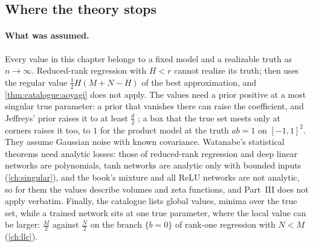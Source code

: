 \begin{refsection}

\section{Where the theory stops}\label{sec:catalogue:stops}

\paragraph{What was assumed.} Every value in this chapter belongs to a fixed model and a realizable truth as $n\to\infty$. Reduced-rank regression with $H<r$ cannot realize its truth; \textcite[\S6.2]{Watanabe2013} then uses the regular value $\frac12H(M+N-H)$ of the best approximation, and \cref{thm:catalogue:aoyagi} does not apply. The values need a prior positive at a most singular true parameter: a prior that vanishes there can raise the coefficient, and Jeffreys' prior raises it to at least $\frac d2$ \parencite{Watanabe2024}; a box that the true set meets only at corners raises it too, to $1$ for the product model at the truth $ab=1$ on $[-1,1]^2$. They assume Gaussian noise with known covariance. Watanabe's statistical theorems need analytic losses: those of reduced-rank regression and deep linear networks are polynomials, tanh networks are analytic only with bounded inputs (\cref{ch:singular}), and the book's mixture and all ReLU networks are not analytic, so for them the values describe volumes and zeta functions, and Part~III does not apply verbatim. Finally, the catalogue lists global values, minima over the true set, while a trained network sits at one true parameter, where the local value can be larger: $\frac M2$ against $\frac N2$ on the branch $\{b=0\}$ of rank-one regression with $N<M$ (\cref{ch:llc}).


\end{refsection}
